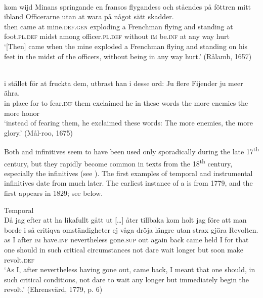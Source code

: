 \documentclass[output=paper]{langscibook}
\begin{document}
\ea
\label{ex:kalm:12}
\ea {}\\\label{ex:kalm:12a}
\gll[Då] kom wijd Minans springande en fransos flygandess och ståendes på föttren       mitt ibland Officerarne utan at wara på något sätt skadder.\\
then came at mine.\textsc{def.gen} exploding a Frenchman flying and standing at foot.\textsc{pl.def} midst among officer.\textsc{pl.def} without \textsc{im} be.\textsc{inf} at any way hurt \\ 
\glt ‘[Then] came when the mine exploded a Frenchman flying and standing on his feet in the midst of the officers, without being in any way hurt.’ (Rålamb, 1657)

\ex {}\\\label{ex:kalm:12b}
\gll i stället för at fruckta dem, utbrast han i desse ord: Ju flere Fijender ju meer ähra.\\
 in place for to fear.\textsc{inf} them exclaimed he in these words the more enemies the more honor\\
\glt ‘instead of fearing them, he exclaimed these words: The more enemies, the more glory.’ (Mål-roo, 1675)
\z 
\z 


Both  and  infinitives seem to have been used only sporadically during the late 17\textsuperscript{th} century, but they rapidly become common in texts from the 18\textsuperscript{th} century, especially the  infinitives (see \citealt[129–130]{Kalm2016Satsekvivalenta}). The first examples of temporal and instrumental infinitives date from much later. The earliest instance of a  is from 1779, and the first  appears in 1829; see  below.  

\ea
\label{ex:kalm:13}
\ea Temporal\label{ex:kalm:13a}\\
\gll Då jag efter att ha likafullt gått {ut […]} åter tillbaka kom holt jag före att man borde i så critiqva omständigheter ej våga dröja längre utan strax gjöra Revolten.\\
as I after \textsc{im} have.\textsc{inf} nevertheless gone.\textsc{sup} out again back came held I for that one should in such critical circumstances not dare wait longer but soon make revolt.\textsc{def}\\
\glt ‘As I, after nevertheless having gone out, came back, I meant that one should, in such critical conditions, not dare to wait any longer but immediately begin the revolt.’ (Ehrensvärd, 1779, p. 6)
\end{document}

